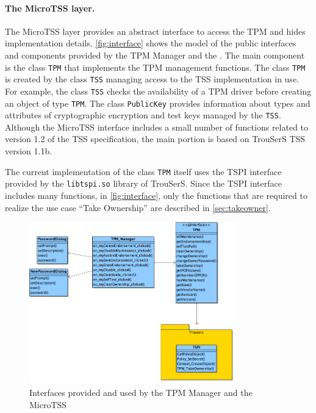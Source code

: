 \documentclass[
  american        %
]{sirrixreport}
\begin{document}
\paragraph{The MicroTSS layer.} The MicroTSS layer provides an abstract interface to access the TPM
and hides implementation details. \autoref{fig:interface} shows the \UML model
of the public interfaces and components provided by the TPM Manager and the \TSPI. The main component is the class \lstinline'TPM' that implements the TPM management
functions. The class \lstinline'TPM' is created by the class \lstinline'TSS' managing access to the TSS implementation in
use. For example, the class \lstinline'TSS' checks the availability of a TPM driver before creating an object
of type \lstinline'TPM'. The class \lstinline'PublicKey' provides information about types and attributes of cryptographic
encryption and test keys managed by the \lstinline'TSS'. Although the MicroTSS interface includes a small
number of functions related to version 1.2 of the TSS specification\cite{TSS_1.2}, the main portion is based on
TrouSerS TSS version 1.1b\cite{TSS_1.1}.


The current implementation of the class \lstinline'TPM' itself uses the TSPI interface provided by the \lstinline'libtspi.so'
library of TrouSerS. Since the TSPI interface includes many functions, in \autoref{fig:interface}, only the 
functions that are required to realize the use case ``Take Ownership'' are described in \autoref{sec:takeowner}.

\begin{figure}[h]
 \centering
 \includegraphics[width=0.8\textwidth]{images/arch_interface}
 \caption{Interfaces provided and used by the TPM Manager and the MicroTSS}
 \label{fig:interface}
\end{figure}
\clearpage
\end{document}
